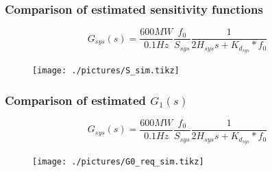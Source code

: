 \begin{frame}
	\frametitle{Comparison of estimated sensitivity functions}
	\begin{equation}\label{eq:G_sys}
		G_{sys}(s) = \frac{600MW}{0.1Hz}\frac{f_0}{S_{sys}}\frac{1}{2H_{sys}s+K_{d_{sys}}*f_0}
\end{equation}
	\begin{figure}
		\texttt{[image: ./pictures/S\_sim.tikz]}
	\end{figure}
\end{frame}
\begin{frame}
		\frametitle{Comparison of estimated $G_1(s)$}
	\begin{equation}\label{eq:G_sys}
		G_{sys}(s) = \frac{600MW}{0.1Hz}\frac{f_0}{S_{sys}}\frac{1}{2H_{sys}s+K_{d_{sys}}*f_0}
\end{equation}
	\begin{figure}
		\texttt{[image: ./pictures/G0\_req\_sim.tikz]}
	\end{figure}
\end{frame}

